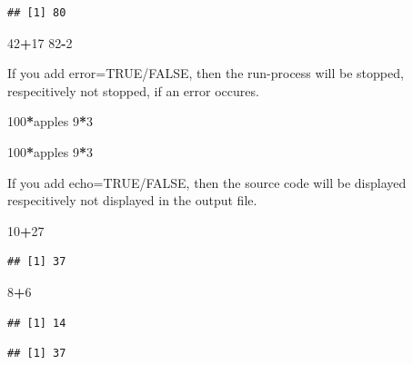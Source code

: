 \documentclass[]{report}
\newenvironment{Shaded}{\begin{snugshade}}{\end{snugshade}}
\newcommand{\DecValTok}[1]{\textcolor[rgb]{0.00,0.00,0.81}{#1}}
\newcommand{\OperatorTok}[1]{\textcolor[rgb]{0.81,0.36,0.00}{\textbf{#1}}}
\newcommand{\NormalTok}[1]{#1}
\begin{document}
\begin{verbatim}
## [1] 80
\end{verbatim}

\begin{Shaded}
\begin{Highlighting}[]
\DecValTok{42}\OperatorTok{+}\DecValTok{17}
\DecValTok{82}\OperatorTok{-}\DecValTok{2}
\end{Highlighting}
\end{Shaded}

If you add error=TRUE/FALSE, then the run-process will be stopped,
respecitively not stopped, if an error occures.

\begin{Shaded}
\begin{Highlighting}[]
\DecValTok{100}\OperatorTok{*}\NormalTok{apples}
\DecValTok{9}\OperatorTok{*}\DecValTok{3}
\end{Highlighting}
\end{Shaded}

\begin{Shaded}
\begin{Highlighting}[]
\DecValTok{100}\OperatorTok{*}\NormalTok{apples}
\DecValTok{9}\OperatorTok{*}\DecValTok{3}
\end{Highlighting}
\end{Shaded}

If you add echo=TRUE/FALSE, then the source code will be displayed
respecitively not displayed in the output file.

\begin{Shaded}
\begin{Highlighting}[]
\DecValTok{10}\OperatorTok{+}\DecValTok{27}
\end{Highlighting}
\end{Shaded}

\begin{verbatim}
## [1] 37
\end{verbatim}

\begin{Shaded}
\begin{Highlighting}[]
\DecValTok{8}\OperatorTok{+}\DecValTok{6}
\end{Highlighting}
\end{Shaded}

\begin{verbatim}
## [1] 14
\end{verbatim}

\begin{verbatim}
## [1] 37
\end{verbatim}
\end{document}
